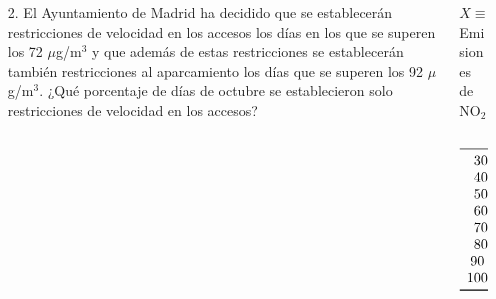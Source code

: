 \documentclass[aspectratio=149,10pt,t]{beamer}
\begin{document}
\begin{frame}
	\begin{columns}
		\begin{column}[T]{0.7\textwidth}
			\begin{enumerate}
				\item[2.] El Ayuntamiento de Madrid ha decidido que se establecerán restricciones de velocidad en los accesos los días en los que se superen los 72 $\mu$g/m$^3$ y que además de estas restricciones se establecerán también restricciones al aparcamiento los días que se superen los 92 $\mu$g/m$^3$.
				¿Qué porcentaje de días de octubre se establecieron solo restricciones de velocidad en los accesos?
			\end{enumerate}
		\end{column}
		\begin{column}[T]{0.3\textwidth}
			\begin{datos}
			$X\equiv$ Emisiones de NO$_2$\\
			\[
				\begin{array}{cc}
					X & F_i\\
					\midrule
					30 - 40 & 0.0645\\
    			40 - 50 & 0.2581\\
    			50 - 60 & 0.5161\\
    			60 - 70 & 0.6774\\
    			70 - 80 & 0.8387\\
    			80 - 90 & 0.9032\\
    			90 - 100 & 0.9677\\
    			100 - 110 & 1.0000\\
					\bottomrule
				\end{array}
			\]
			\end{datos}
		\end{column}
	\end{columns}
\end{frame}
\end{document}

